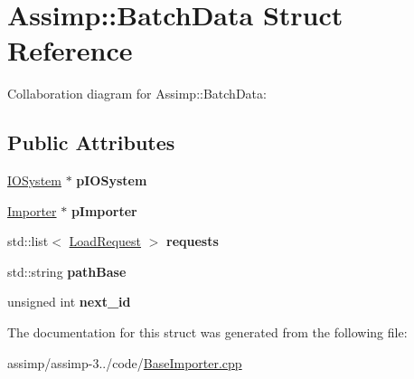 \hypertarget{struct_assimp_1_1_batch_data}{\section{Assimp\+:\+:Batch\+Data Struct Reference}
\label{struct_assimp_1_1_batch_data}
}


Collaboration diagram for Assimp\+:\+:Batch\+Data\+:
\subsection*{Public Attributes}
\begin{DoxyCompactItemize}
\item 
\hypertarget{struct_assimp_1_1_batch_data_a4634b1e153cf2f8566d3f06618642d81}{\hyperlink{class_assimp_1_1_i_o_system}{I\+O\+System} $\ast$ {\bfseries p\+I\+O\+System}}\label{struct_assimp_1_1_batch_data_a4634b1e153cf2f8566d3f06618642d81}

\item 
\hypertarget{struct_assimp_1_1_batch_data_ad735565e1b932d3b589c32b410dd2a98}{\hyperlink{class_assimp_1_1_importer}{Importer} $\ast$ {\bfseries p\+Importer}}\label{struct_assimp_1_1_batch_data_ad735565e1b932d3b589c32b410dd2a98}

\item 
\hypertarget{struct_assimp_1_1_batch_data_af2f703bf03f4befb996868349504ff0e}{std\+::list$<$ \hyperlink{struct_assimp_1_1_load_request}{Load\+Request} $>$ {\bfseries requests}}\label{struct_assimp_1_1_batch_data_af2f703bf03f4befb996868349504ff0e}

\item 
\hypertarget{struct_assimp_1_1_batch_data_a7e51f9a524ba73f909dc8aa7af6be2a5}{std\+::string {\bfseries path\+Base}}\label{struct_assimp_1_1_batch_data_a7e51f9a524ba73f909dc8aa7af6be2a5}

\item 
\hypertarget{struct_assimp_1_1_batch_data_ac33f48b74b3c83ece3e459eec0f9ee7e}{unsigned int {\bfseries next\+\_\+id}}\label{struct_assimp_1_1_batch_data_ac33f48b74b3c83ece3e459eec0f9ee7e}

\end{DoxyCompactItemize}


The documentation for this struct was generated from the following file\+:\begin{DoxyCompactItemize}
\item 
assimp/assimp-\/3../code/\hyperlink{_base_importer_8cpp}{Base\+Importer.\+cpp}\end{DoxyCompactItemize}
